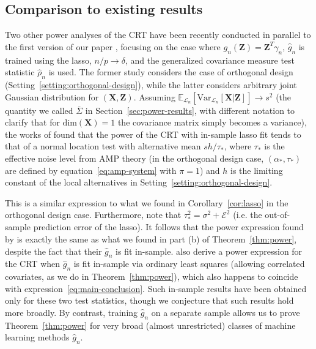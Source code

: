 \documentclass[ejs]{imsart}
\numberwithin{equation}{section}
\theoremstyle{plain}
\theoremstyle{definition}
\theoremstyle{remark}
\newcommand{\prx}{\bm X}
\newcommand{\prz}{\bm Z}
\begin{document}
\subsection{Comparison to existing results} \label{sec:comparison-to-existing-results-4}

Two other power analyses of the CRT have been recently conducted \citep{Wang2020b, Celentano2020} in parallel to the first version of our paper \citep{Katsevich2020a}, focusing on the case where $g_n(\prz) = \prz^T \gamma_n$, $\widehat g_n$ is trained using the lasso, $n/p \rightarrow \delta$, and the generalized covariance measure test statistic $\widehat \rho_n$ is used. The former study considers the case of orthogonal design (Setting~\ref{setting:orthogonal-design}), while the latter considers arbitrary joint Gaussian distribution for $(\prx,\prz)$. Assuming $\mathbb E_{\mathcal L_n}[\text{Var}_{\mathcal L_n}[\prx|\prz]] \rightarrow s^2$ (the quantity we called $\overline \Sigma$ in Section~\ref{sec:power-results}, with different notation to clarify that for $\text{dim}(\prx) = 1$ the covariance matrix simply becomes a variance), the works of \citet{Wang2020b, Celentano2020} found that the power of the CRT with in-sample lasso fit tends to that of a normal location test with alternative mean $sh/\tau_*$, where $\tau_*$ is the effective noise level from AMP theory (in the orthogonal design case, $(\alpha_*, \tau_*)$ are defined by equation~\eqref{eq:amp-system} with $\pi = 1$) and $h$ is the limiting constant of the local alternatives in Setting~\ref{setting:orthogonal-design}. 

This is a similar expression to what we found in Corollary~\ref{cor:lasso} in the orthogonal design case. Furthermore, note that $\tau_*^2 = \sigma^2 + \mathcal E^2$ (i.e. the out-of-sample prediction error of the lasso). It follows that the power expression found by \cite{Wang2020b, Celentano2020} is exactly the same as what we found in part (b) of Theorem~\ref{thm:power}, despite the fact that their $\widehat g_n$ is fit in-sample. \cite{Wang2020b} also derive a power expression for the CRT when $\widehat g_n$ is fit in-sample via ordinary least squares (allowing correlated covariates, as we do in Theorem~\ref{thm:power}), which also happens to coincide with expression~\eqref{eq:main-conclusion}. Such in-sample results have been obtained only for these two test statistics, though we conjecture that such results hold more broadly. By contrast, training $\widehat g_n$ on a separate sample allows us to prove Theorem~\ref{thm:power} for very broad (almost unrestricted) classes of machine learning methods $\widehat g_n$.
\end{document}

